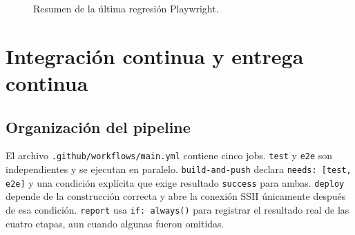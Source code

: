 \documentclass[12pt,a4paper]{article}
\begin{document}
\begin{figure}[H]
  \centering
  \caption{Resumen de la última regresión Playwright.}
  \label{fig:playwright}
\end{figure}

\section{Integración continua y entrega continua}

\subsection{Organización del pipeline}

El archivo \texttt{.github/workflows/main.yml} contiene cinco jobs. \texttt{test} y \texttt{e2e} son independientes y se ejecutan en paralelo. \texttt{build-and-push} declara \texttt{needs: [test, e2e]} y una condición explícita que exige resultado \texttt{success} para ambas. \texttt{deploy} depende de la construcción correcta y abre la conexión SSH únicamente después de esa condición. \texttt{report} usa \texttt{if: always()} para registrar el resultado real de las cuatro etapas, aun cuando algunas fueron omitidas.
\end{document}
